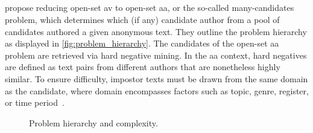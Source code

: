 \subsection{\impApprTitle{}}
\label{sec:impostor_method_theory}

\citet{koppel_determining_2014} propose reducing open-set \ac{av} to open-set \ac{aa}, or the so-called many-candidates problem, which determines which (if any) candidate author from a pool of candidates authored a given anonymous text. 
They outline the problem hierarchy as displayed in \autoref{fig:problem_hierarchy}.
The candidates of the open-set \ac{aa} problem are retrieved via hard negative mining. 
In the \ac{aa} context, hard negatives are defined as text pairs from different authors that are nonetheless highly similar. 
To ensure difficulty, impostor texts must be drawn from the same domain as the candidate, where domain encompasses factors such as topic, genre, register, or time period~\citep{bischoff_importance_2020}. 

\begin{figure}[htbp]
    \centering
    
    \caption{Problem hierarchy and complexity.}
    \label{fig:problem_hierarchy}
\end{figure}










